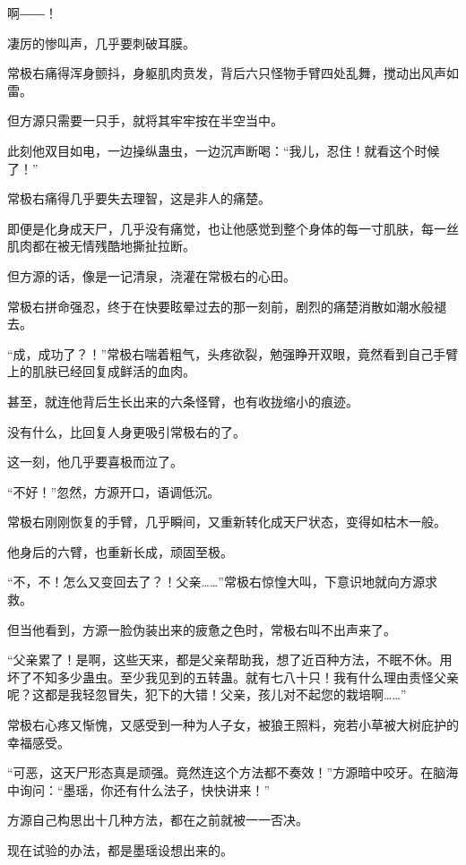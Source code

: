 
\begin{this_body}

啊――！

凄厉的惨叫声，几乎要刺破耳膜。

常极右痛得浑身颤抖，身躯肌肉贲发，背后六只怪物手臂四处乱舞，搅动出风声如雷。

但方源只需要一只手，就将其牢牢按在半空当中。

此刻他双目如电，一边操纵蛊虫，一边沉声断喝：“我儿，忍住！就看这个时候了！”

常极右痛得几乎要失去理智，这是非人的痛楚。

即便是化身成天尸，几乎没有痛觉，也让他感觉到整个身体的每一寸肌肤，每一丝肌肉都在被无情残酷地撕扯拉断。

但方源的话，像是一记清泉，浇灌在常极右的心田。

常极右拼命强忍，终于在快要眩晕过去的那一刻前，剧烈的痛楚消散如潮水般褪去。

“成，成功了？！”常极右喘着粗气，头疼欲裂，勉强睁开双眼，竟然看到自己手臂上的肌肤已经回复成鲜活的血肉。

甚至，就连他背后生长出来的六条怪臂，也有收拢缩小的痕迹。

没有什么，比回复人身更吸引常极右的了。

这一刻，他几乎要喜极而泣了。

“不好！”忽然，方源开口，语调低沉。

常极右刚刚恢复的手臂，几乎瞬间，又重新转化成天尸状态，变得如枯木一般。

他身后的六臂，也重新长成，顽固至极。

“不，不！怎么又变回去了？！父亲……”常极右惊惶大叫，下意识地就向方源求救。

但当他看到，方源一脸伪装出来的疲惫之色时，常极右叫不出声来了。

“父亲累了！是啊，这些天来，都是父亲帮助我，想了近百种方法，不眠不休。用坏了不知多少蛊虫。至少我见到的五转蛊。就有七八十只！我有什么理由责怪父亲呢？这都是我轻忽冒失，犯下的大错！父亲，孩儿对不起您的栽培啊……”

常极右心疼又惭愧，又感受到一种为人子女，被狼王照料，宛若小草被大树庇护的幸福感受。

“可恶，这天尸形态真是顽强。竟然连这个方法都不奏效！”方源暗中咬牙。在脑海中询问：“墨瑶，你还有什么法子，快快讲来！”

方源自己构思出十几种方法，都在之前就被一一否决。

现在试验的办法，都是墨瑶设想出来的。


\end{this_body}
